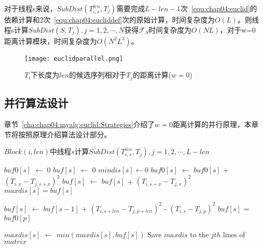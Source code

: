 对于线程s来说，$SubDist(T_{i,s}^{len},T_j)$需要完成$L-len-1$次~\ref{equ:chap04:euclid}的依赖计算和2次~\ref{equ:chap04:eucliddef}次的原始计算，时间复杂度为$O(L)$。则线程s计算$SubDist(S,T_j),j=1,2,\cdots,N$获得$\mathcal{F}_S$时间复杂度为$O(NL)$，对于w=0距离计算模块，时间复杂度为$O(N^2L^3)$。

\begin{figure}[H] %
	\centering
	\texttt{[image: euclidparallel.png]}
	\caption{$T_i$下长度为$len$的候选序列相对于$T_j$的距离计算($w=0$)}
	\label{fig:euclidparallel}
\end{figure}

\subsection{并行算法设计}
\label{cha:chap04:myalg:euclid:algdesign}

章节~\ref{cha:chap04:myalg:euclid:Strategies}介绍了$w=0$距离计算的并行原理，本章节将按照原理介绍算法设计部分。

\begin{breakablealgorithm}
	\caption{$Block(i,len)$中线程$s$计算$SubDist(T_{i,s}^{len},T_j),j=1,2,\cdots,L-len$}
	\label{alg:kernel_ComputeDist}
	\begin{algorithmic}[1]
			  \label{alg:kernel_ComputeDist:OutlineFor}
				\State $buf0[s]$ $\gets$ $0$ \label{alg:kernel_ComputeDist:eucliddefst}
				\State $buf[s]$ $\gets$ $0$
				\State $mindis[s] \gets 0$
					\State $buf0[s]$ $\gets$ $buf0[s]$ + $(T_{i,x}-T_{j,s+x})^2$  \label{alg:kernel_ComputeDist:dengjia1}
					\State $buf[s]$ $\gets$ $buf[s]$ + $(T_{i,s+x}-T_{j,x})^2$
				\EndFor  \label{alg:kernel_ComputeDist:eucliddefed}
				\State $maxdis[s] = buf[s]$	
				
				 \label{alg:kernel_ComputeDist:euclid}
					   \label{alg:kernel_ComputeDist:Warpdevergence1}
						\State $buf[s]$ $\gets$ $buf[s-1]$ + $(T_{i,s+len}-T_{j,p+len})^2$ - $(T_{i,s}-T_{j,p})^2$
					\EndIf
					     \label{alg:kernel_ComputeDist:Warpdevergence2}
						\State $buf[s]$ = $buf0[p]$ \label{alg:kernel_ComputeDist:dengjia2}
					\EndIf
					
					\State $maxdis[s]$ $\gets$ $min(maxdis[s],buf[s])$
				\EndFor
				\State Save $maxdis$ to the $jth$ lines of $matrix$ \label{maxdisoutput}
			\EndFor
		\EndFunction
	\end{algorithmic}
\end{breakablealgorithm}

